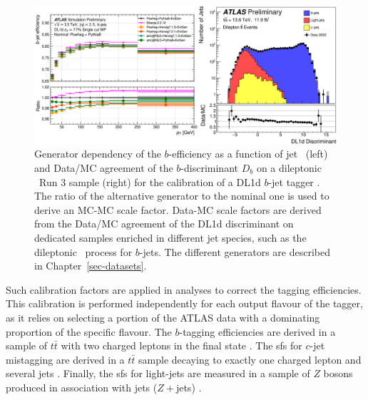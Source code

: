 \begin{center}
  \begin{figure}[h!]
  \centerline{
  \includegraphics[width=\textwidth]{Images/FTAG/calib/sfAg.png}
  }
  \caption{Generator dependency of the $b$-efficiency as a function of jet \pt\ (left) and Data/MC agreement of the $b$-discriminant $D_b$ on a dileptonic \ttb\ Run 3 sample (right) for the calibration of a DL1d $b$-jet tagger \cite{ATL-PLOT-FTAG-2023-01}. The ratio of the alternative generator to the nominal one is used to derive an MC-MC scale factor. Data-MC scale factors are derived from the Data/MC agreement of the DL1d discriminant on dedicated samples enriched in different jet species, such as the dileptonic \ttb\ process for $b$-jets. The different generators are described in Chapter~\ref{sec-datasets}.}
  \label{fig:calibFtagDL1d}
  \end{figure} 
\end{center}
\vspace{-1cm}
Such calibration factors are applied in analyses to correct the tagging efficiencies. This calibration is performed independently for each output flavour of the tagger, as it relies on selecting a portion of the ATLAS data with a dominating proportion of the specific flavour. The $b$-tagging efficiencies are derived in a sample of $t\bar{t}$ with two charged leptons in the final state \cite{Aad:2019aic}. The \glspl{sf} for $c$-jet mistagging are derived in a $t\bar{t}$ sample decaying to exactly one charged lepton and several jets \cite{cjettaggingCalib}. Finally, the \glspl{sf} for light-jets are measured in a sample of $Z$ bosons produced in association with jets ($Z+$jets) \cite{ATLAS:2023lwk}. \\ %

